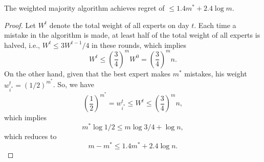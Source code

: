 \begin{theorem}
\claimlabel

The weighted majority algorithm achieves regret of $\leq 1.4m^* + 2.4\log m$. 
\end{theorem}

\begin{proof}
Let $W^t$ denote the total weight of all experts on day $t$. Each time a mistake in the algorithm is made, at least half of the total weight of all experts is halved, i.e., $W^t\leq 3W^{t-1}/4$ in these rounds, which implies 
\[W^t \leq \left(\frac{3}{4}\right)^mW^0 = \left(\frac{3}{4}\right)^mn.\]
On the other hand, given that the best expert makes $m^*$ mistakes, his weight $w_{i^*}^t = (1/2)^{m^*}$. So, we have 
\[\left(\frac{1}{2}\right)^{m^*} = w_{i^*}^t\leq W^t\leq \left(\frac{3}{4}\right)^mn,\]
which implies 
\[m^*\log1/2\leq m\log3/4+\log n,\]
which reduces to 
\[m-m^*\leq 1.4m^* + 2.4\log n.\]
\end{proof}



